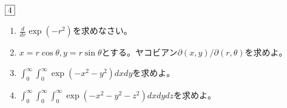 \documentclass[dvipdfmx]{jsreport}
\begin{document}
\begin{souanswer} %

\end{souanswer}

\begin{tcolorbox} %
	$\fbox{4}$
\begin{enumerate}
	\item $\frac{d}{dr}\exp{(-r^2)}$を求めなさい。
	\item $x= r\cos{\theta}, y= r\sin{\theta}$とする。ヤコビアン${\partial(x, y)}/{\partial(r, \theta)}$を求めよ。
	\item $\int_0^\infty \int_0^\infty \exp{(-x^2- y^2)}dxdy$を求めよ。
	\item $\int_0^\infty \int_0^\infty\int_0^\infty \exp{(-x^2- y^2- z^2)}dxdydz$を求めよ。
\end{enumerate}
\end{tcolorbox}

\begin{souanswer} %

\end{souanswer}
\end{document}
